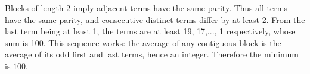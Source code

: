 Blocks of length 2 imply adjacent terms have the same parity. Thus all terms have the same parity, and consecutive distinct terms differ by at least 2. From the last term being at least 1, the terms are at least 19, 17,..., 1 respectively, whose sum is 100. This sequence works: the average of any contiguous block is the average of its odd first and last terms, hence an integer. Therefore the minimum is $\boxed{100}$.
